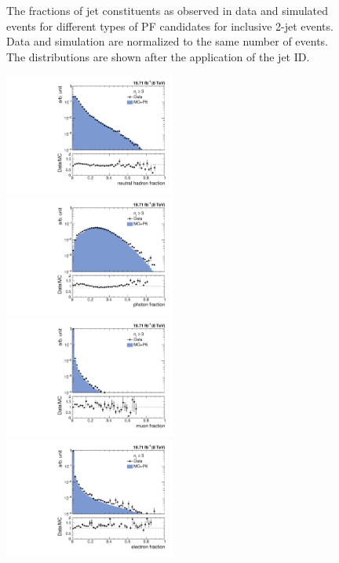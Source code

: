 \begin{figure}[!htbp]
\begin{center}
    \caption{The fractions of jet constituents as observed in data and simulated events for different types of PF candidates for inclusive 2-jet events. Data and simulation are normalized to the same number of events. The distributions are shown after the application of the jet ID.}
    \label{fig:qual2}
  \end{center}
\end{figure} 

\begin{figure}[!htbp]
  \begin{center}
    \includegraphics[width=0.5\textwidth]{Plots_HT_2_150/Comparison_NuHadFrac_3_HT_2_150.pdf}%
    ~~\includegraphics[width=0.5\textwidth]{Plots_HT_2_150/Comparison_PhFrac_3_HT_2_150.pdf}\\
    \includegraphics[width=0.5\textwidth]{Plots_HT_2_150/Comparison_MuFrac_3_HT_2_150.pdf}%
    ~~\includegraphics[width=0.5\textwidth]{Plots_HT_2_150/Comparison_ElFrac_3_HT_2_150.pdf}\\

\end{center}
\end{figure}
